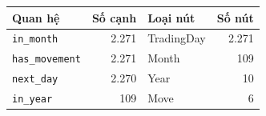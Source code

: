 \begin{tabular}{lrlr}
\toprule
Quan hệ & Số cạnh & Loại nút & Số nút \\
\midrule
\texttt{in\_month} & 2{.}271 & TradingDay & 2{.}271 \\
\texttt{has\_movement} & 2{.}271 & Month & 109 \\
\texttt{next\_day} & 2{.}270 & Year & 10 \\
\texttt{in\_year} & 109 & Move & 6 \\
\bottomrule
\end{tabular}
